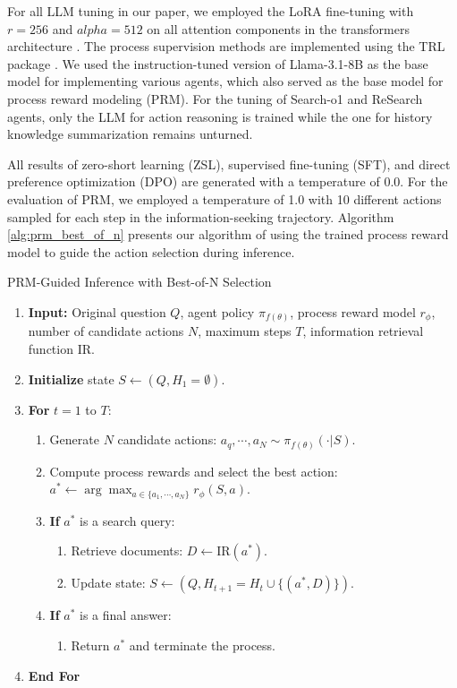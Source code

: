 For all LLM tuning in our paper, we employed the LoRA fine-tuning \cite{hu2021lora} with \(r=256\) and \(alpha=512\) on all attention components in the transformers architecture \cite{vaswani2017attention}. The process supervision methods are implemented using the TRL package \cite{vonwerra2022trl}. We used the instruction-tuned version of Llama-3.1-8B as the base model for implementing various agents, which also served as the base model for process reward modeling (PRM). For the tuning of Search-o1 and ReSearch agents, only the LLM for action reasoning is trained while the one for history knowledge summarization remains unturned.

All results of zero-short learning (ZSL), supervised fine-tuning (SFT), and direct preference optimization (DPO) are generated with a temperature of 0.0. For the evaluation of PRM, we employed a temperature of 1.0 with 10 different actions sampled for each step in the information-seeking trajectory. Algorithm \ref{alg:prm_best_of_n} presents our algorithm of using the trained process reward model to guide the action selection during inference.


\begin{algorithm}
\caption{PRM-Guided Inference with Best-of-N Selection}
\label{alg:prm_best_of_n}
\begin{enumerate}
    \item \textbf{Input:} Original question $Q$, agent policy $\pi_{f(\theta)}$, process reward model $r_{\phi}$, number of candidate actions $N$, maximum steps $T$, information retrieval function IR.
    \item \textbf{Initialize} state $S \leftarrow (Q, H_1 = \emptyset)$.
    \item \textbf{For} $t = 1$ to $T$:
    \begin{enumerate}
        \item Generate $N$ candidate actions: $a_q,\cdots,a_N \sim \pi_{f(\theta)}(\cdot|S)$.
        \item Compute process rewards and select the best action: $a^* \leftarrow \arg\max_{a \in \{a_1,\cdots,a_N\}} r_{\phi}(S, a) $.
        
        \item \textbf{If} $a^*$ is a search query:
        \begin{enumerate}
            \item Retrieve documents: $D \leftarrow \text{IR}(a^*)$.
            \item Update state: $S \leftarrow (Q, H_{t+1} = H_{t} \cup \{(a^*, D)\})$.
        \end{enumerate}
        
        \item \textbf{If} $a^*$ is a final answer:
        \begin{enumerate}
            \item Return $a^*$ and terminate the process.
        \end{enumerate}
    \end{enumerate}
    \item \textbf{End For}
\end{enumerate}
\end{algorithm}

